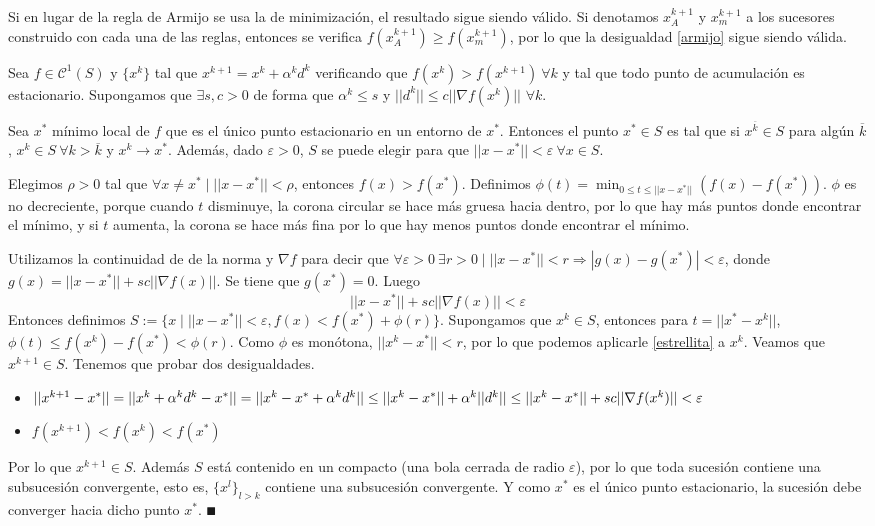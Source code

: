 \documentclass[MIOP.tex]{subfiles}
\begin{document}
\begin{nota}
Si en lugar de la regla de Armijo se usa la de minimización, el resultado sigue siendo válido. Si denotamos $x^{k+1}_A$ y $x^{k+1}_m$ a los sucesores construido con cada una de las reglas, entonces se verifica $f(x^{k+1}_A)\geq f(x^{k+1}_m)$, por lo que la desigualdad \ref{armijo} sigue siendo válida.
\end{nota}

\begin{teorema}[de captura]
Sea $f\in\mathcal{C}^1(S)$ y $\{x^k\}$ tal que $x^{k+1}=x^k+\alpha^k d^k$ verificando que $f(x^k)>f(x^{k+1})\ \forall k$ y tal que todo punto de acumulación es estacionario. Supongamos que $\exists s,c>0$ de forma que $\alpha^k\leq s$ y $||d^k||\leq c||\nabla f(x^k)||$ $\forall k.$

Sea $x^*$ mínimo local de $f$ que es el único punto estacionario en un entorno de $x^*$. Entonces el punto $x^*\in S$ es tal que si $x^{\overline{k}}\in S$ para algún $\overline{k}$, $x^k\in S\ \forall k>\overline{k}$ y $x^k\to x^*$. Además, dado $\varepsilon>0$, $S$ se puede elegir para que $||x-x^*||<\varepsilon \ \forall x\in S$.
\end{teorema}
\begin{dem}
Elegimos $\rho>0$ tal que $\forall x\neq x^*\mid ||x-x^*||<\rho$, entonces $f(x)>f(x^*)$. Definimos $\phi
(t)=\min_{0\leq t\leq ||x-x^*||} (f(x)-f(x^*))$. $\phi$ es no decreciente, porque cuando $t$ disminuye, la corona circular se hace más gruesa hacia dentro, por lo que hay más puntos donde encontrar el mínimo, y si $t$ aumenta, la corona se hace más fina por lo que hay menos puntos donde encontrar el mínimo.

Utilizamos la continuidad de de la norma y $\nabla f$ para decir que $\forall \varepsilon>0\ \exists r>0\mid ||x-x^*||<r\Rightarrow |g(x)-g(x^*)|<\varepsilon$, donde $g(x)=||x-x^*||+sc||\nabla f(x)||$. Se tiene que $g(x^*)=0$. Luego
\begin{equation}\label{estrellita}
||x-x^*||+sc||\nabla f(x)||<\varepsilon 
\end{equation}
Entonces definimos $S:=\{x\mid ||x-x^*||<\varepsilon, f(x)< f(x^*)+\phi(r)\}$. Supongamos que $x^k\in S$, entonces para $t=||x^*-x^k||$, $\phi(t)\leq f(x^k)-f(x^*)<\phi(r)$. Como $\phi$ es monótona, $||x^k-x^*||<r$, por lo que podemos aplicarle \ref{estrellita} a $x^k$. Veamos que $x^{k+1}\in S$. Tenemos que probar dos desigualdades.
\begin{itemize}
\item $||x^{k+1}-x^*||=||x^k+\alpha^kd^k-x^*||=||x^k-x^*+\alpha^kd^k||\leq ||x^k-x^*||+\alpha^k||d^k||\leq\\ ||x^k-x^*||+sc||\nabla f(x^k)||<\varepsilon$
\item $f(x^{k+1})<f(x^k)<f(x^*)$
\end{itemize}
Por lo que $x^{k+1}\in S$. Además $S$ está contenido en un compacto (una bola cerrada de radio $\varepsilon$), por lo que toda sucesión contiene una subsucesión convergente, esto es, $\{x^l\}_{l>k}$ contiene una subsucesión convergente. Y como $x^*$ es el único punto estacionario, la sucesión debe converger hacia dicho punto $x^*$. $\QED$
\end{dem}
\end{document}
